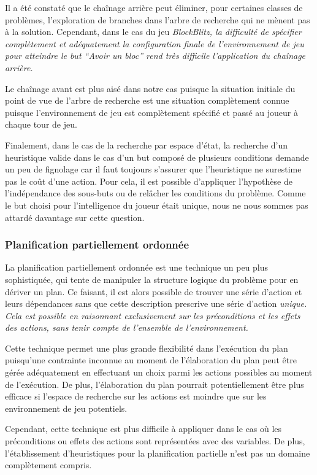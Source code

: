 \documentclass[12pt,english,frenchb,letterpaper]{article}
\begin{document}
Il a été constaté que le chaînage arrière peut éliminer, pour certaines classes de problèmes, l'exploration de branches dans l'arbre de recherche qui ne mènent pas à la solution.  Cependant, dans le cas du jeu \it{BlockBlitz}, la difficulté de spécifier complètement et adéquatement la configuration finale de l'environnement de jeu pour atteindre le but ``Avoir un bloc'' rend très difficile l'application du chaînage arrière.

Le chaînage avant est plus aisé dans notre cas puisque la situation initiale du point de vue de l'arbre de recherche est une situation complètement connue puisque l'environnement de jeu est complètement spécifié et passé au joueur à chaque tour de jeu.

Finalement, dans le cas de la recherche par espace d'état, la recherche d'un heuristique valide dans le cas d'un but composé de plusieurs conditions demande un peu de fignolage car il faut toujours s'assurer que l'heuristique ne surestime pas le coût d'une action.  Pour cela, il est possible d'appliquer l'hypothèse de l'indépendance des sous-buts ou de relâcher les conditions du problème.  Comme le but choisi pour l'intelligence du joueur était unique, nous ne nous sommes pas attardé davantage sur cette question.

\subsubsection{Planification partiellement ordonnée}

La planification partiellement ordonnée est une technique un peu plus sophistiquée, qui tente de manipuler la structure logique du problème pour en dériver un plan.  Ce faisant, il est alors possible de trouver une série d'action et leurs dépendances sans que cette description prescrive une série d'action \it{unique}.  Cela est possible en raisonnant \it{exclusivement} sur les préconditions et les effets des actions, sans tenir compte de l'ensemble de l'environnement.

Cette technique permet une plus grande flexibilité dans l'exécution du plan puisqu'une contrainte inconnue au moment de l'élaboration du plan peut être gérée adéquatement en effectuant un choix parmi les actions possibles au moment de l'exécution.  De plus, l'élaboration du plan pourrait potentiellement être plus efficace si l'espace de recherche sur les actions est moindre que sur les environnement de jeu potentiels.

Cependant, cette technique est plus difficile à appliquer dans le cas où les préconditions ou effets des actions sont représentées avec des variables.  De plus, l'établissement d'heuristiques pour la planification partielle n'est pas un domaine complètement compris.
\end{document}
